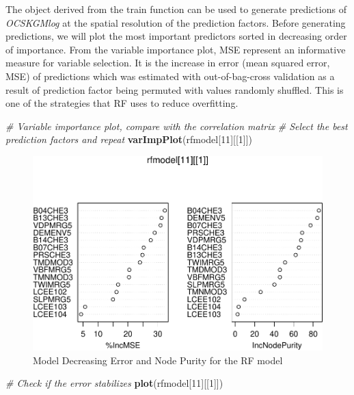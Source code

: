 \documentclass[10pt,b5paper,]{book}
\newenvironment{Shaded}{\begin{snugshade}}{\end{snugshade}}
\newcommand{\CommentTok}[1]{\textcolor[rgb]{0.56,0.35,0.01}{\textit{#1}}}
\newcommand{\DecValTok}[1]{\textcolor[rgb]{0.00,0.00,0.81}{#1}}
\newcommand{\KeywordTok}[1]{\textcolor[rgb]{0.13,0.29,0.53}{\textbf{#1}}}
\newcommand{\NormalTok}[1]{#1}
\theoremstyle{definition}
\theoremstyle{definition}
\theoremstyle{definition}
\theoremstyle{remark}
\begin{document}
The object derived from the train function can be used to generate
predictions of \emph{OCSKGMlog} at the spatial resolution of the
prediction factors. Before generating predictions, we will plot the most
important predictors sorted in decreasing order of importance. From the
variable importance plot, MSE represent an informative measure for
variable selection. It is the increase in error (mean squared error,
MSE) of predictions which was estimated with out-of-bag-cross validation
as a result of prediction factor being permuted with values randomly
shuffled. This is one of the strategies that RF uses to reduce
overfitting.

\begin{Shaded}
\begin{Highlighting}[]
\CommentTok{# Variable importance plot, compare with the correlation matrix}
\CommentTok{# Select the best prediction factors and repeat  }
\KeywordTok{varImpPlot}\NormalTok{(rfmodel[}\DecValTok{11}\NormalTok{][[}\DecValTok{1}\NormalTok{]])}
\end{Highlighting}
\end{Shaded}

\begin{figure}
\centering
\includegraphics{SOCMapping_files/figure-latex/unnamed-chunk-59-1.pdf}
\caption{\label{fig:unnamed-chunk-59}Model Decreasing Error and Node Purity
for the RF model}
\end{figure}

\begin{Shaded}
\begin{Highlighting}[]
\CommentTok{# Check if the error stabilizes }
\KeywordTok{plot}\NormalTok{(rfmodel[}\DecValTok{11}\NormalTok{][[}\DecValTok{1}\NormalTok{]])}
\end{Highlighting}
\end{Shaded}
\end{document}
